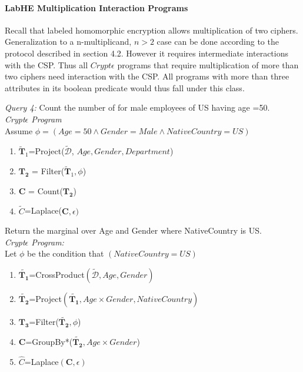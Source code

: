 \paragraph{\textbf{LabHE Multiplication Interaction Programs}}
Recall that labeled homomorphic encryption allows multiplication of two ciphers. Generalization to a n-multiplicand, $n > 2$ case can be done according to the protocol described in section 4.2. However it requires intermediate interactions with the \textsf{CSP}. Thus all $Crypt\epsilon$ programs that require multiplication of more than two ciphers need interaction with the \textsf{CSP}. 
All programs with more than three attributes in its boolean predicate would thus fall under this class.
\begin{exmp}\textit{Query 4:} Count the number of for male employees of US having age =50. \\\textit{Crypt$\epsilon$ Program} \\Assume $\phi=(Age=50 \wedge Gender=Male \wedge NativeCountry=US)$ \end{exmp} \begin{enumerate} \item $\mathbf{\tilde{T}}_1$=Project($\boldsymbol{\tilde{\mathcal{D}}}$, $Age,Gender,Department$)  \item  $\mathbf{T_2}$ = Filter($\mathbf{\tilde{T}}_1,\phi$)\item $\mathbf{C}$ = Count($\mathbf{T_2}$) \item $\tilde{C}$=Laplace($\mathbf{C},\epsilon)$\end{enumerate}
\begin{exmp}Return the marginal over Age and Gender where NativeCountry is US. \\\textit{Crypt$\epsilon$ Program:}\\ Let $\phi$ be the condition that $(NativeCountry=US) $  \begin{enumerate}\item $\tilde{\mathbf{T_1}}$=\textsf{CrossProduct}$(\boldsymbol{\tilde{\mathcal{D}}},Age,Gender)$ \item $\tilde{\mathbf{T_2}}$=\textsf{Project}$(\tilde{\mathbf{T_1}}, Age \times Gender, NativeCountry)$ \item $\mathbf{T_3}$=\textsf{Filter}($\tilde{\mathbf{T_2}},\phi$)\item $\mathbf{C}$=\textsf{GroupBy*}($\tilde{\mathbf{T_2}},Age\times Gender$)\item $\hat{C}$=\textsf{Laplace}$(\mathbf{C},\epsilon)$ \end{enumerate}\end{exmp}
